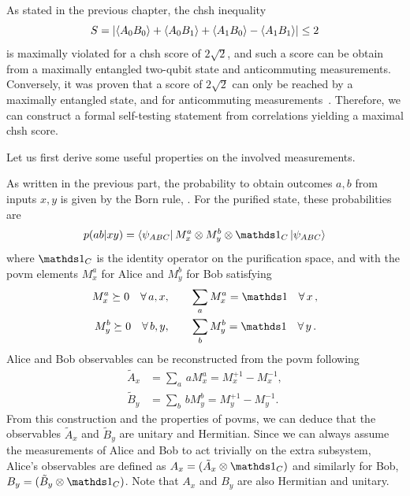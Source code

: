 \medbreak

As stated in the previous chapter, the \acrshort{chsh} inequality 
\begin{equation}
	S = \left | \langle {A_0 B_0} \rangle + \langle {A_0 B_1} \rangle + \langle {A_1 B_0} \rangle - \langle {A_1 B_1} \rangle  \right | \leq 2
\end{equation}
is maximally violated for a \acrshort{chsh} score of $2\sqrt{2}$, and such a score can be obtain from a maximally entangled two-qubit state and anticommuting measurements. 
Conversely, it was proven that a score of $2\sqrt{2}$ can only be reached by a maximally entangled state, and for anticommuting measurements~\cite{Summers1987,Popescu92,Tsirelson1993}. 
Therefore, we can construct a formal self-testing statement from correlations yielding a maximal \acrshort{chsh} score.

\medbreak

Let us first derive some useful properties on the involved measurements.

As written in the previous part, the probability to obtain outcomes $a,b$ from inputs $x,y$ is given by the Born rule, . 
For the purified state, these probabilities are
\begin{equation}
	p(ab|xy) = \bra{\psi_{ABC}} M^a_x \otimes M^b_y \otimes \id_C \ket{\psi_{ABC}}
\end{equation}
where $\id_C$ is the identity operator on the purification space, and with the \acrshort{povm} elements $M^a_x$ for Alice and $M^b_y$ for Bob satisfying
\begin{equation}
	\begin{split}
		M^{a}_x \succeq 0 \quad \forall\,a,x, &\qquad \sum_a M^a_x = \id \quad \forall\,x\, ,\\
		M^{b}_y \succeq 0 \quad \forall\,b,y, &\qquad \sum_b M^b_y = \id \quad \forall\,y\, .
	\end{split}
\end{equation}
Alice and Bob observables can be reconstructed from the \acrshort{povm} following
\begin{equation}
	\begin{split}
		\tilde{A}_x &= \sum_a \,a M^a_x = M^{+1}_x - M^{-1}_x, \\
		\tilde{B}_y &= \sum_b \,b M^b_y = M^{+1}_y - M^{-1}_y.
	\end{split}	
\end{equation}
From this construction and the properties of \acrshort{povm}s, we can deduce that the observables $\tilde{A}_x$ and $\tilde{B}_y$ are unitary and Hermitian.
Since we can always assume the measurements of Alice and Bob to act trivially on the extra subsystem, Alice's observables are defined as $A_x = (\tilde{A}_x \otimes \id_C)$ and similarly for Bob, $B_y=(\tilde{B}_y \otimes \id_C)$. 
Note that $A_x$ and $B_y$ are also Hermitian and unitary.
 
